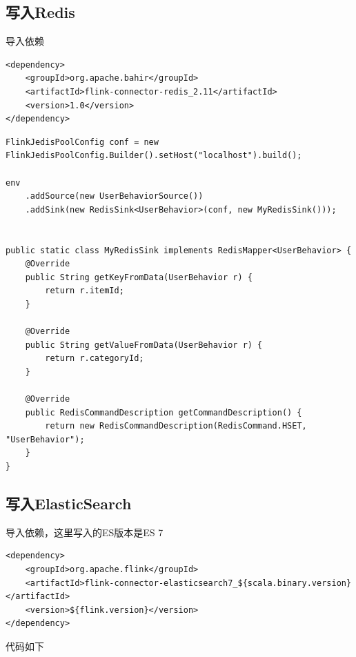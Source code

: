 \documentclass[cn,11pt,chinese]{elegantbook}
\begin{document}
\subsection{写入Redis}

导入依赖

\begin{verbatim}
<dependency>
    <groupId>org.apache.bahir</groupId>
    <artifactId>flink-connector-redis_2.11</artifactId>
    <version>1.0</version>
</dependency>
\end{verbatim}

\begin{verbatim}
FlinkJedisPoolConfig conf = new FlinkJedisPoolConfig.Builder().setHost("localhost").build();

env
    .addSource(new UserBehaviorSource())
    .addSink(new RedisSink<UserBehavior>(conf, new MyRedisSink()));
    
    
public static class MyRedisSink implements RedisMapper<UserBehavior> {
    @Override
    public String getKeyFromData(UserBehavior r) {
        return r.itemId;
    }
    
    @Override
    public String getValueFromData(UserBehavior r) {
        return r.categoryId;
    }
    
    @Override
    public RedisCommandDescription getCommandDescription() {
        return new RedisCommandDescription(RedisCommand.HSET, "UserBehavior");
    }
}
\end{verbatim}

\subsection{写入ElasticSearch}

导入依赖，这里写入的ES版本是ES 7

\begin{verbatim}
<dependency>
    <groupId>org.apache.flink</groupId>
    <artifactId>flink-connector-elasticsearch7_${scala.binary.version}</artifactId>
    <version>${flink.version}</version>
</dependency>
\end{verbatim}

代码如下
\end{document}
